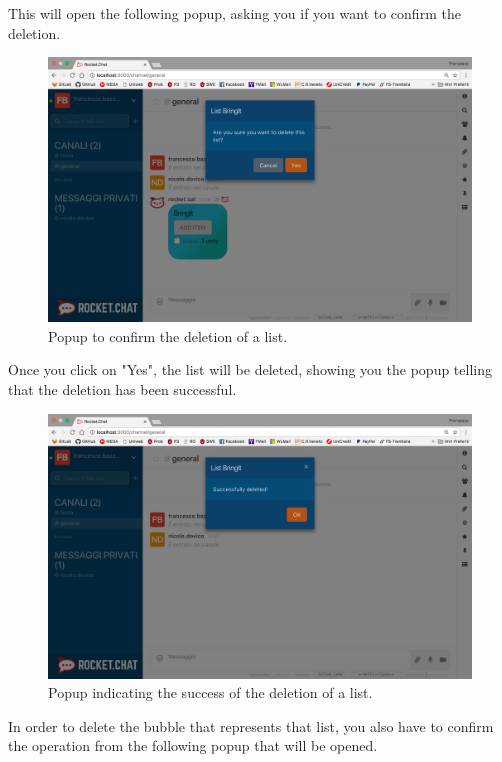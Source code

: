 This will open the following popup, asking you if you want to confirm the deletion.

\begin{figure}[H]
  \centering 
  \includegraphics[width=\textwidth]{Sections/3-HowToUse/Images/popup_delete_confirm.png}
  \caption{Popup to confirm the deletion of a list.}
\end{figure}

Once you click on "Yes", the list will be deleted, showing you the popup telling that the deletion has been successful.

\begin{figure}[H]
  \centering 
  \includegraphics[width=\textwidth]{Sections/3-HowToUse/Images/popup_delete_success.png}
  \caption{Popup indicating the success of the deletion of a list.}
\end{figure}

In order to delete the bubble that represents that list, you also have to confirm the operation from the following popup that will be opened.

